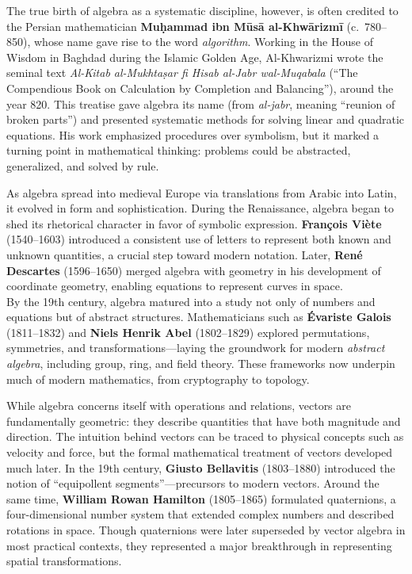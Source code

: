 \documentclass{book}
\begin{document}
The true birth of algebra as a systematic discipline, however, is often credited to the Persian mathematician \textbf{Muḥammad ibn Mūsā al-Khwārizmī} (c.~780--850), whose name gave rise to the word \emph{algorithm}. Working in the House of Wisdom in Baghdad during the Islamic Golden Age, Al-Khwarizmi wrote the seminal text \emph{Al-Kitab al-Mukhtaṣar fi Hisab al-Jabr wal-Muqabala} (``The Compendious Book on Calculation by Completion and Balancing''), around the year 820. This treatise gave algebra its name (from \emph{al-jabr}, meaning ``reunion of broken parts'') and presented systematic methods for solving linear and quadratic equations. His work emphasized procedures over symbolism, but it marked a turning point in mathematical thinking: problems could be abstracted, generalized, and solved by rule.

As algebra spread into medieval Europe via translations from Arabic into Latin, it evolved in form and sophistication. During the Renaissance, algebra began to shed its rhetorical character in favor of symbolic expression. \textbf{François Viète} (1540--1603) introduced a consistent use of letters to represent both known and unknown quantities, a crucial step toward modern notation. Later, \textbf{René Descartes} (1596--1650) merged algebra with geometry in his development of coordinate geometry, enabling equations to represent curves in space.\\

By the 19th century, algebra matured into a study not only of numbers and equations but of abstract structures. Mathematicians such as \textbf{Évariste Galois} (1811--1832) and \textbf{Niels Henrik Abel} (1802--1829) explored permutations, symmetries, and transformations---laying the groundwork for modern \emph{abstract algebra}, including group, ring, and field theory. These frameworks now underpin much of modern mathematics, from cryptography to topology.

While algebra concerns itself with operations and relations, vectors are fundamentally geometric: they describe quantities that have both magnitude and direction. The intuition behind vectors can be traced to physical concepts such as velocity and force, but the formal mathematical treatment of vectors developed much later. In the 19th century, \textbf{Giusto Bellavitis} (1803--1880) introduced the notion of ``equipollent segments''---precursors to modern vectors. Around the same time, \textbf{William Rowan Hamilton} (1805--1865) formulated quaternions, a four-dimensional number system that extended complex numbers and described rotations in space. Though quaternions were later superseded by vector algebra in most practical contexts, they represented a major breakthrough in representing spatial transformations.\\
\end{document}
